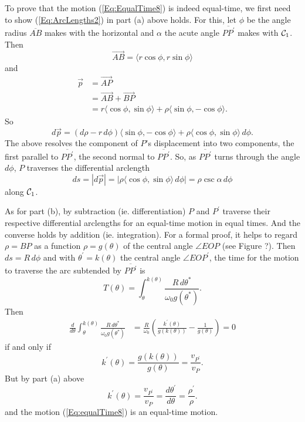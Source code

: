\documentclass{ximera}
\begin{document}
To prove that the motion (\ref{Eq:EqualTime8}) is indeed equal-time, we first need to show (\ref{Eq:ArcLengths2}) in part (a) above holds. For this, let $\phi$ be the angle radius $\overline{AB}$ makes with the horizontal and $\alpha$ the acute angle $\overline{PP^\prime}$ makes with ${\cal C}_1$. Then 
\[
      \overrightarrow{AB} = \langle r\cos \phi, r\sin\phi \rangle
\]
and
\begin{align*}
    \overrightarrow{p} &= \overrightarrow{AP}   \\
                                &= \overrightarrow{AB}+\overrightarrow{BP} \\
                                &= r\langle \cos \phi, \sin \phi \rangle + \rho \langle \sin\phi, -\cos\phi  \rangle . 
\end{align*}
So
\[
    d\overrightarrow{p} = (d\rho - r \, d\phi ) \langle \sin \phi, -\cos \phi \rangle+ \rho \langle \cos\phi, \sin\phi \rangle \, d\phi .
\]
The above resolves the component of $P$'s displacement into two components, the first parallel to $\overline{PP^\prime}$, the second normal to $\overline{PP^\prime}$. So, as $\overline{PP^\prime}$ turns through the angle $d\phi$, $P$ traverses the differential arclength
\[
   ds = |d\overrightarrow{p}| = |  \rho \langle \cos\phi, \sin\phi \rangle \, d\phi |    = \rho \csc \alpha \, d\phi
\]
along ${\cal C}_1$. 

As for part (b), by subtraction (ie. differentiation)  $P$ and $P^\prime$ traverse their respective differential arclengths for an equal-time motion in equal times. And the converse holds by addition (ie. integration). For a formal proof, it helps to regard $\rho = BP$ as a function $\rho = g(\theta)$ of the central angle $\angle EOP$ (see Figure ?). Then $ds = R \, d\phi$ and with $\theta^\prime = k(\theta)$ the central angle $\angle EOP^\prime$, the time for the motion to traverse the arc subtended by $\overline{PP^\prime}$ is
\[
  T(\theta) =  \int_\theta^{k(\theta)} \frac{R\, d\theta^*}{\omega_0 g(\theta^*)}.
\]
Then
\begin{align*}
  \frac{d}{d\theta} \int_\theta^{k(\theta)} \frac{R\, d\theta^*}{\omega_0 g(\theta^*)} &= \frac{R}{\omega_0}\left(   \frac{k^\prime(\theta)}{g(k(\theta))} - \frac{1}{g(\theta)}        \right) = 0
\end{align*}
if and only if 
\[
    k^\prime(\theta) = \frac{g(k(\theta))}{g(\theta)} = \frac{v_{P^\prime}}{v_P}.
\]
But by part (a) above
\[
   k^\prime(\theta) = \frac{v_{P^\prime}}{v_P}   =  \frac{d\theta^\prime}{d\theta} =   \frac{\rho^\prime}{\rho}.
\]
and the motion (\ref{Eq:equalTime8}) is an equal-time motion.
\end{document}
